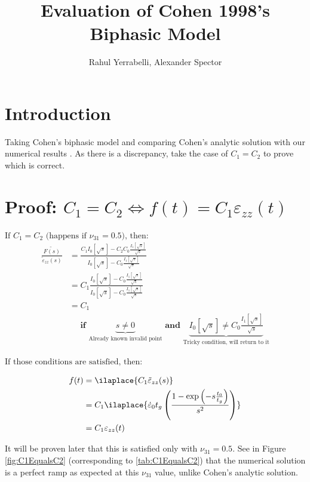 \documentclass{article}
\title{Evaluation of Cohen 1998's Biphasic Model}
\author{Rahul Yerrabelli, Alexander Spector}
\begin{document}
\maketitle

\tableofcontents


\section{Introduction}
Taking Cohen's biphasic model and comparing Cohen's analytic solution with our numerical results \cite{cohen1998}. As there is a discrepancy, take the case of $C_1=C_2$ to prove which is correct.

\section{Proof: $C_1=C_2 \iff f(t)=C_1 \varepsilon_{zz}(t) $}

$\text{If $C_1=C_2$ (happens if $\nu_{31}=0.5$), then:}$
\begin{align}
\frac{\widetilde{F(s)}}{\tilde{\varepsilon}_{zz}(s)}
&=\frac{C_{1} I_{0}\left[\sqrt{s}\right]-C_{2} C_{0} \frac{I_{1}\left[\sqrt{s}\right]}{\sqrt{s}}}{I_{0}\left[\sqrt{s}\right]-C_{0} \frac{I_{1}\left[\sqrt{s}\right]}{\sqrt{s}}}  \\
&= C_{1} \frac{I_{0}\left[\sqrt{s}\right]-C_{0} \frac{I_{1}\left[\sqrt{s}\right]}{\sqrt{s}}}{I_{0}\left[\sqrt{s}\right]-C_{0} \frac{I_{1}\left[\sqrt{s}\right]}{\sqrt{s}}}  \\
&= C_1 \\
&\quad \textbf{ if } \underbrace{s\neq0}_{\text{Already known } \text{invalid point}} \textbf{ and }
\underbrace{I_{0}\left[\sqrt{s}\right] \neq C_{0} \frac{I_{1}\left[\sqrt{s}\right]}{\sqrt{s}}}_{\text{Tricky condition, } \text{will return to it}}
\end{align}

$\text{If those conditions are satisfied, then:}$

\begin{align}
f(t) &= \ilaplace{C_1 \tilde{\varepsilon}_{zz}(s)} \\
&= C_1 \ilaplace{\dot{\varepsilon}_{0} t_{g} \left( \frac{1-\exp \left(-s \frac{t_{0}}{t_{g}}\right)}{s^{2}} \right)} \\
&= C_1 \varepsilon_{zz}(t)
\end{align}

It will be proven later that this is satisfied only with $\nu_{31}=0.5$. See in Figure \ref{fig:C1EqualsC2} (corresponding to \ref{tab:C1EqualsC2}) that the numerical solution is a perfect ramp as expected at this $\nu_{31}$ value, unlike Cohen's analytic solution.
\end{document}
